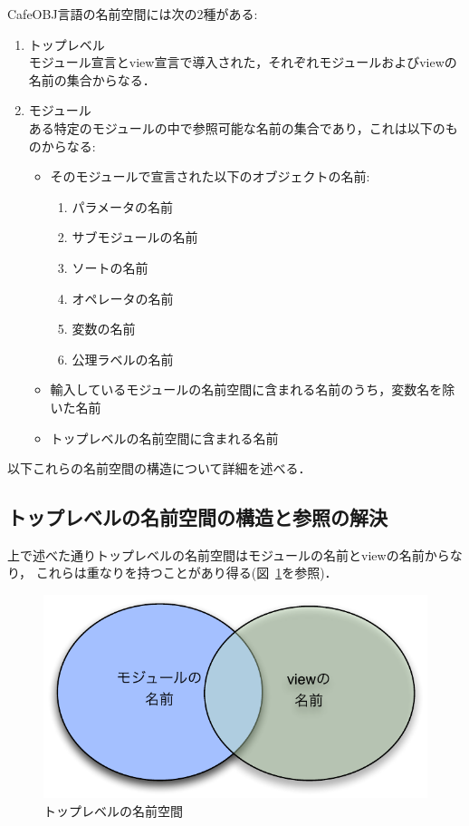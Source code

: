 \documentclass[a4paper,oneside,10pt]{memoir}
\begin{document}
CafeOBJ言語の名前空間には次の2種がある:
\begin{enumerate}
\item トップレベル\\
  モジュール宣言とview宣言で導入された，それぞれモジュールおよびviewの名前の集合からなる．
\item モジュール\\
  ある特定のモジュールの中で参照可能な名前の集合であり，これは以下のものからなる:
  \begin{itemize}
    \item そのモジュールで宣言された以下のオブジェクトの名前:
      \begin{enumerate}
      \item パラメータの名前
      \item サブモジュールの名前
      \item ソートの名前
      \item オペレータの名前
      \item 変数の名前
      \item 公理ラベルの名前
      \end{enumerate}
    \item 輸入しているモジュールの名前空間に含まれる名前のうち，変数名を除いた名前
    \item トップレベルの名前空間に含まれる名前
  \end{itemize}
\end{enumerate}

以下これらの名前空間の構造について詳細を述べる．

\subsection{トップレベルの名前空間の構造と参照の解決}
\label{sec:toplevel-name-space}
上で述べた通りトップレベルの名前空間はモジュールの名前とviewの名前からなり，
これらは重なりを持つことがあり得る(図~\ref{fig:toplevel}を参照)．

\begin{figure}[H]
\begin{center}
  \includegraphics[scale=0.7]{toplevel.pdf}
\caption{トップレベルの名前空間}
\label{fig:toplevel}
\end{center}
\end{figure}
\end{document}

